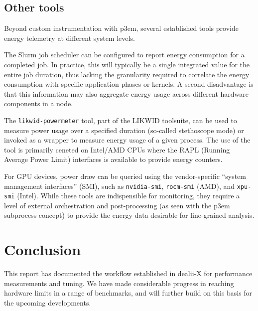 \documentclass[a4paper,12pt]{article}
\begin{document}
\subsection{{Other tools}}

Beyond custom instrumentation with p3em, several established tools provide
energy telemetry at different system levels.

The Slurm job scheduler can be configured to report energy consumption for
a completed job. In practice, this will typically be a single integrated value
for the entire job duration, thus lacking the granularity required to
correlate the energy consumption with specific application phases or kernels.
A second disadvantage is that this information may also aggregate energy usage
across different hardware components in a node.

The \texttt{likwid-powermeter} tool, part of the LIKWID toolsuite,
 can be used to measure power usage
over a specified duration (so-called stethoscope mode) or invoked as a wrapper
to measure energy usage of a given process.
The use of the tool is primarily ceneted on Intel/AMD CPUs where the RAPL (Running Average Power Limit)
interfaces is available to provide energy counters.

For GPU devices, power draw can be queried using the vendor-specific
``system management interfaces'' (SMI),
such as \texttt{nvidia-smi}, \texttt{rocm-smi} (AMD), and \texttt{xpu-smi} (Intel).
While these tools are indispensible for monitoring, they require a level
of external orchestration and post-processing (as seen with the p3em subprocess concept)
to provide the energy data desirable for fine-grained analysis.


\section{{Conclusion}} \label{sec:conclusion}


This report has documented the workflow established in dealii-X for
performance measurements and tuning. We have made considerable progress in
reaching hardware limits in a range of benchmarks, and will further build on
this basis for the upcoming developments.






\label{MyLastPage}
\end{document}
